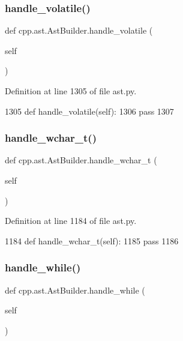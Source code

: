 \subsubsection{\texorpdfstring{handle\+\_\+volatile()}{handle\_volatile()}}
{\footnotesize\ttfamily def cpp.\+ast.\+Ast\+Builder.\+handle\+\_\+volatile (\begin{DoxyParamCaption}\item[{}]{self }\end{DoxyParamCaption})}



Definition at line 1305 of file ast.\+py.


\begin{DoxyCode}
1305     \textcolor{keyword}{def }handle\_volatile(self):
1306         \textcolor{keywordflow}{pass}
1307 
\end{DoxyCode}
\mbox{\label{classcpp_1_1ast_1_1AstBuilder_a4ec65909aea14f45709733d631aed57b}} 
\subsubsection{\texorpdfstring{handle\+\_\+wchar\+\_\+t()}{handle\_wchar\_t()}}
{\footnotesize\ttfamily def cpp.\+ast.\+Ast\+Builder.\+handle\+\_\+wchar\+\_\+t (\begin{DoxyParamCaption}\item[{}]{self }\end{DoxyParamCaption})}



Definition at line 1184 of file ast.\+py.


\begin{DoxyCode}
1184     \textcolor{keyword}{def }handle\_wchar\_t(self):
1185         \textcolor{keywordflow}{pass}
1186 
\end{DoxyCode}
\mbox{\label{classcpp_1_1ast_1_1AstBuilder_aac812e812ba2e5fbd80dde93be01a414}} 
\subsubsection{\texorpdfstring{handle\+\_\+while()}{handle\_while()}}
{\footnotesize\ttfamily def cpp.\+ast.\+Ast\+Builder.\+handle\+\_\+while (\begin{DoxyParamCaption}\item[{}]{self }\end{DoxyParamCaption})}



